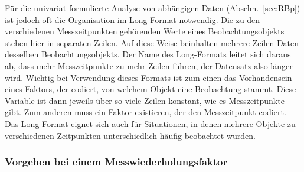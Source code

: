 Für die univariat formulierte Analyse von abhängigen Daten (Abschn.\ \ref{sec:RBp}) ist jedoch oft die Organisation im Long-Format notwendig. Die zu den verschiedenen Messzeitpunkten gehörenden Werte eines Beobachtungsobjekts stehen hier in separaten Zeilen. Auf diese Weise beinhalten mehrere Zeilen Daten desselben Beobachtungsobjekts. Der Name des Long-Formats leitet sich daraus ab, dass mehr Messzeitpunkte zu mehr Zeilen führen, der Datensatz also länger wird. Wichtig bei Verwendung dieses Formats ist zum einen das Vorhandensein eines Faktors, der codiert, von welchem Objekt eine Beobachtung stammt. Diese Variable ist dann jeweils über so viele Zeilen konstant, wie es Messzeitpunkte gibt. Zum anderen muss ein Faktor existieren, der den Messzeitpunkt codiert. Das Long-Format eignet sich auch für Situationen, in denen mehrere Objekte zu verschiedenen Zeitpunkten unterschiedlich häufig beobachtet wurden.

\subsubsection{Vorgehen bei einem Messwiederholungsfaktor}

